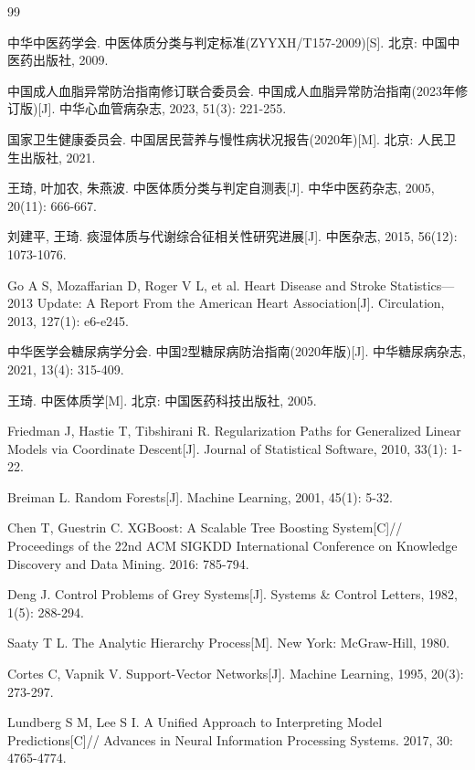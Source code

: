 \documentclass[12pt,a4paper]{ctexart}
\begin{document}
\newpage
\begin{thebibliography}{99}

 中华中医药学会. 中医体质分类与判定标准(ZYYXH/T157-2009)[S]. 北京: 中国中医药出版社, 2009.

 中国成人血脂异常防治指南修订联合委员会. 中国成人血脂异常防治指南(2023年修订版)[J]. 中华心血管病杂志, 2023, 51(3): 221-255.

 国家卫生健康委员会. 中国居民营养与慢性病状况报告(2020年)[M]. 北京: 人民卫生出版社, 2021.

 王琦, 叶加农, 朱燕波. 中医体质分类与判定自测表[J]. 中华中医药杂志, 2005, 20(11): 666-667.

 刘建平, 王琦. 痰湿体质与代谢综合征相关性研究进展[J]. 中医杂志, 2015, 56(12): 1073-1076.

 Go A S, Mozaffarian D, Roger V L, et al. Heart Disease and Stroke Statistics—2013 Update: A Report From the American Heart Association[J]. Circulation, 2013, 127(1): e6-e245.

 中华医学会糖尿病学分会. 中国2型糖尿病防治指南(2020年版)[J]. 中华糖尿病杂志, 2021, 13(4): 315-409.

 王琦. 中医体质学[M]. 北京: 中国医药科技出版社, 2005.

 Friedman J, Hastie T, Tibshirani R. Regularization Paths for Generalized Linear Models via Coordinate Descent[J]. Journal of Statistical Software, 2010, 33(1): 1-22.

 Breiman L. Random Forests[J]. Machine Learning, 2001, 45(1): 5-32.

 Chen T, Guestrin C. XGBoost: A Scalable Tree Boosting System[C]// Proceedings of the 22nd ACM SIGKDD International Conference on Knowledge Discovery and Data Mining. 2016: 785-794.

 Deng J. Control Problems of Grey Systems[J]. Systems \& Control Letters, 1982, 1(5): 288-294.

 Saaty T L. The Analytic Hierarchy Process[M]. New York: McGraw-Hill, 1980.

 Cortes C, Vapnik V. Support-Vector Networks[J]. Machine Learning, 1995, 20(3): 273-297.

 Lundberg S M, Lee S I. A Unified Approach to Interpreting Model Predictions[C]// Advances in Neural Information Processing Systems. 2017, 30: 4765-4774.


\end{thebibliography}
\end{document}
